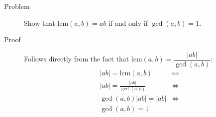 \begin{description}
\item[Problem] Show that $\text{lcm}(a, b) = ab$ if and only if $\gcd(a,b) =
1$.

\item[Proof] Follows directly from the fact that $\text{lcm}(a, b) =
\dfrac{|ab|} {\gcd(a, b)}$:
\begin{align*}
|ab| = \text{lcm}(a, b) &\iff \\
|ab| = \frac{|ab|} {\gcd(a, b)} &\iff \\
\gcd(a, b) |ab| = |ab| &\iff \\
\gcd(a, b) = 1
\end{align*}

\end{description}
